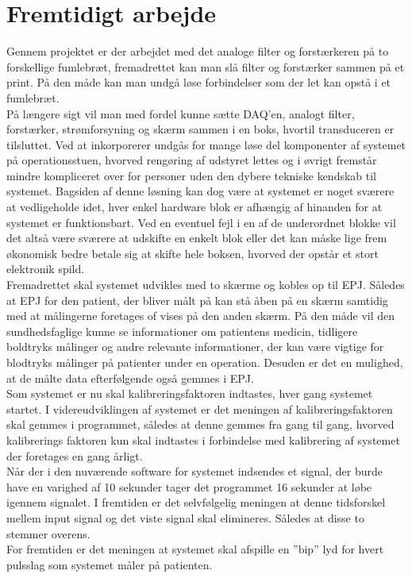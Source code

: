 \section{Fremtidigt arbejde} \label{fremtid}
Gennem projektet er der arbejdet med det analoge filter og forstærkeren på to forskellige fumlebræt, fremadrettet kan man slå filter og forstærker sammen på et print. På den måde kan man undgå løse forbindelser som der let kan opstå i et fumlebræt.\\[1ex]
På længere sigt vil man med fordel kunne sætte DAQ’en, analogt filter, forstærker, strømforsyning og skærm sammen i en boks, hvortil transduceren er tilsluttet. Ved at inkorporerer undgås for mange løse del komponenter af systemet på operationsstuen, hvorved rengøring af udstyret lettes og i øvrigt fremstår mindre kompliceret over for personer uden den dybere tekniske kendskab til systemet. Bagsiden af denne løsning kan dog være at systemet er noget sværere at vedligeholde idet, hver enkel hardware blok er afhængig af hinanden for at systemet er funktionsbart. Ved en eventuel fejl i en af de underordnet blokke vil det altså være sværere at udskifte en enkelt blok eller det kan måske lige frem økonomisk bedre betale sig at skifte hele boksen, hvorved der opstår et stort elektronik spild.\\[1ex]
Fremadrettet skal systemet udvikles med to skærme og kobles op til EPJ. Således at EPJ for den patient, der bliver målt på kan stå åben på en skærm samtidig med at målingerne foretages of vises på den anden skærm. På den måde vil den sundhedsfaglige kunne se informationer om patientens medicin, tidligere boldtryks målinger og andre relevante informationer, der kan være vigtige for blodtryks målinger på patienter under en operation. Desuden er det en mulighed, at de målte data efterfølgende også gemmes i EPJ.\\[1ex]
Som systemet er nu skal kalibreringsfaktoren indtastes, hver gang systemet startet. I videreudviklingen af systemet er det meningen af kalibreringsfaktoren skal gemmes i programmet, således at denne gemmes fra gang til gang, hvorved kalibrerings faktoren kun skal indtastes i forbindelse med kalibrering af systemet der foretages en gang årligt. \\ [1ex]
Når der i den nuværende software for systemet indsendes et signal, der burde have en varighed af 10 sekunder tager det programmet 16 sekunder at løbe igennem signalet. I fremtiden er det selvfølgelig meningen at denne tidsforskel mellem input signal og det viste signal skal elimineres. Således at disse to stemmer overens.\\[1ex]
For fremtiden er det meningen at systemet skal afspille en ”bip” lyd for hvert pulsslag som systemet måler på patienten. \\
